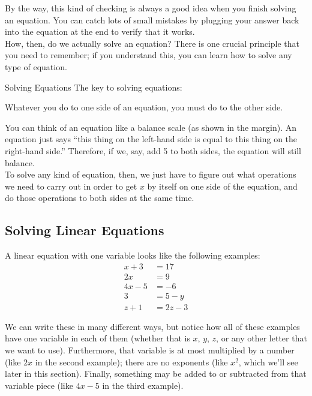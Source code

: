 By the way, this kind of checking is always a good idea when you finish solving an equation.  You can catch lots of small mistakes by plugging your answer back into the equation at the end to verify that it works.\\

How, then, do we actually solve an equation?  There is one crucial principle that you need to remember; if you understand this, you can learn how to solve any type of equation.

\begin{proc}{Solving Equations}
The key to solving equations:
\begin{center}
Whatever you do to one side of an equation, you must do to the other side.
\end{center}

You can think of an equation like a balance scale (as shown in the margin).  An equation just says ``this thing on the left-hand side is equal to this thing on the right-hand side.''  Therefore, if we, say, add 5 to both sides, the equation will still balance.\\

To solve any kind of equation, then, we just have to figure out what operations we need to carry out in order to get $x$ by itself on one side of the equation, and do those operations to both sides at the same time.
\end{proc}
\pagebreak

\subsection{Solving Linear Equations}
A linear equation with one variable looks like the following examples:
\begin{align*}
x + 3 &= 17\\
2x &= 9\\
4x - 5 &= -6\\
3 &= 5-y\\
z+1 &= 2z-3
\end{align*}

We can write these in many different ways, but notice how all of these examples have one variable in each of them (whether that is $x$, $y$, $z$, or any other letter that we want to use).  Furthermore, that variable is at most multiplied by a number (like $2x$ in the second example); there are no exponents (like $x^2$, which we'll see later in this section).  Finally, something may be added to or subtracted from that variable piece (like $4x-5$ in the third example).\\

